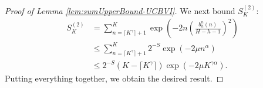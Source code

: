 \documentclass[10pt,a4paper]{amsart}
\begin{document}
\begin{proof}[Proof of Lemma \ref{lem:sumUpperBound-UCBVI}]
We next bound $S_K^{(2)}$:
\begin{align*}
S^{(2)}_K
&=\sum_{n=\lceil K^\gamma\rceil + 1}^{K} \exp\left(- 2n \left(\frac{b_h^{n}(n)}{H-h-1} \right)^2\right)\\
&\le\sum_{n= \lceil K^\gamma\rceil+1}^{K}2^{-S}\exp\left(-2\mu  n^{\alpha}\right) \\
&\leq 2^{-S} (K - \lceil K^\gamma\rceil)\exp\left(-2\mu  K^{\gamma\alpha}\right).
\end{align*}
Putting everything together, we obtain the desired result.
\end{proof}
\end{document}
